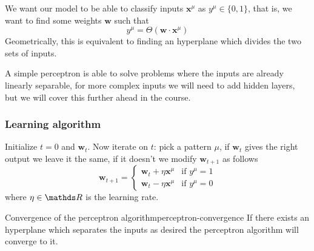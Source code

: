 \documentclass[12pt]{extarticle}
\renewcommand{\vec}[1]{\bm{#1}}
\begin{document}
We want our model to be able to classify inputs $\vec x^\mu$ as $y^\mu \in \{0, 1\}$,
that is, we want to find some weights $\vec w$ such that
\begin{equation}
	y^\mu = \Theta(\vec w \cdot \vec x^\mu)
\end{equation}
Geometrically, this is equivalent to finding an hyperplane which divides the two sets of inputs.

A simple perceptron is able to solve problems where the inputs are already linearly separable,
for more complex inputs we will need to add hidden layers, but we will cover this further
ahead in the course.

\subsubsection{Learning algorithm}

Initialize $t = 0$ and $\vec w_t$.
Now iterate on $t$: pick a pattern $\mu$, if $\vec w_t$ gives the right output we leave it the same,
if it doesn't we modify $\vec w_{t+1}$ as follows
\begin{equation}
	\vec w_{t + 1} = \begin{cases}
		\vec w_t + \eta \vec x^\mu & \text{if } y^\mu = 1 \\
		\vec w_t - \eta \vec x^\mu & \text{if } y^\mu = 0
	\end{cases}
\end{equation}
where $\eta \in \R$ is the learning rate.

\begin{proposition}{Convergence of the perceptron algorithm}{perceptron-convergence}
	If there exists an hyperplane which separates the inputs as desired
	the perceptron algorithm will converge to it.
\end{proposition}
\end{document}
